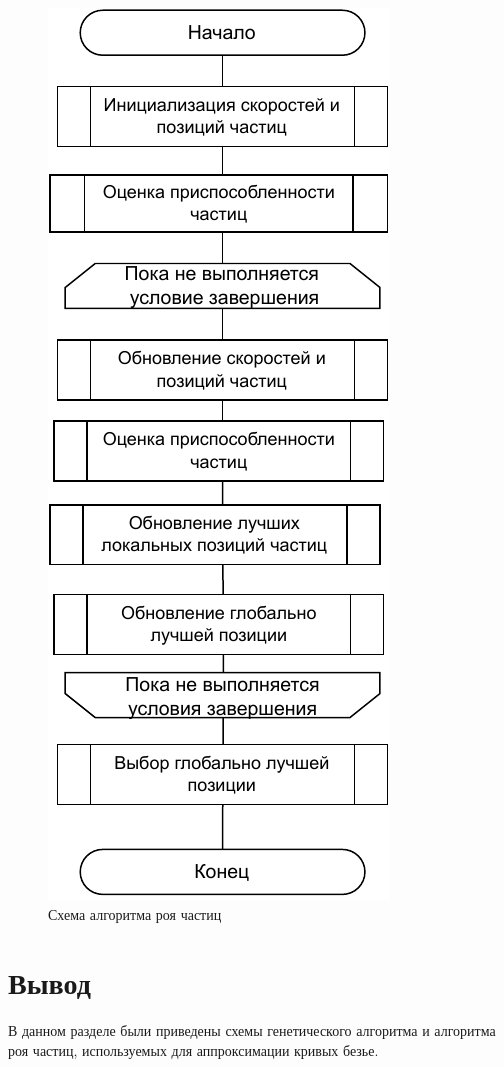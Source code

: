 \documentclass[12pt]{report}
\begin{document}
\begin{figure}[h!]
  \centering
  \includegraphics[scale = 0.9]{algo_pso.pdf}
  \caption{Схема алгоритма роя частиц}
  \label{fig:algo_pso}
\end{figure}

\section*{Вывод}
В данном разделе были приведены схемы генетического алгоритма и алгоритма роя частиц, используемых для аппроксимации кривых безье.
\end{document}
